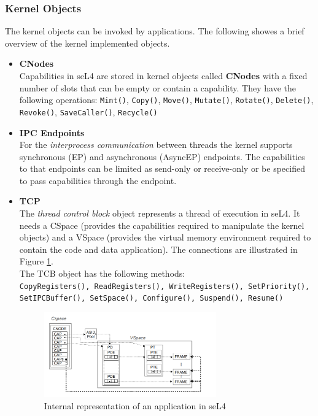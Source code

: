 \documentclass[pdftex,11pt,a4paper]{article}
\begin{document}
	\subsubsection{Kernel Objects}
	The kernel objects can be invoked by applications. The following showes a brief overview of the kernel implemented objects. 
	\begin{itemize}
	\item \textbf{CNodes} \\
	Capabilities in seL4 are stored in kernel objects called \textbf{CNodes} with a fixed number of slots that can be empty or contain a capability. They have the following operations:
	\texttt{Mint()}, \texttt{Copy()}, \texttt{Move()}, \texttt{Mutate()}, \texttt{Rotate()}, \texttt{Delete()}, \texttt{Revoke()}, \texttt{SaveCaller()}, \texttt{Recycle()}
	\item \textbf{IPC Endpoints} \\
	For the \textit{interprocess communication} between threads the kernel supports synchronous (EP) and asynchronous (AsyncEP) endpoints. The capabilities to that endpoints can be limited as send-only or receive-only or be specified to pass capabilities through the endpoint.  
	\item \textbf{TCP} \\
	The \textit{thread control block} object represents a thread of execution in seL4. It needs a CSpace (provides the capabilities required to manipulate the kernel objects) and a VSpace (provides the virtual memory environment required to contain the code and data application). The connections are illustrated in Figure \ref{fig:intapp}. \\
	The TCB object has the following methods: \\
	\texttt{CopyRegisters(), ReadRegisters(), WriteRegisters(), SetPriority(), SetIPCBuffer(), SetSpace(), Configure(), Suspend(), Resume()}
	
	\begin{figure}[ht]
	\centering
		\includegraphics[width=0.7\textwidth]{./Pictures/applicationIntern.png}
	\caption[Internal repersentation of application]{Internal representation of an application in seL4 \cite{sel4}}
	\label{fig:intapp}
	\end{figure}
	

\end{itemize}
\end{document}
